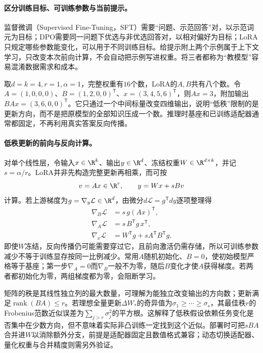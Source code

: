 \paragraph{区分训练目标、可训练参数与当前提示。}
监督微调（Supervised Fine-Tuning，SFT）需要“问题、示范回答”对，以示范词元为目标；DPO需要同一问题下优选与非优选回答对，以相对偏好为目标；LoRA只规定哪些参数能变化，可以用于不同训练目标。给提示附上两个示例属于上下文学习，只改变本次前向计算，不会自动把示例写进权重。将三者都称为“教模型”容易混淆数据需求和成本。

取$d=k=4,r=1,\alpha=1$，完整权重有$16$个数，LoRA的$A,B$共有八个数。令$A=(1,0,0,0)$、$B=(1,2,0,0)^{\mathsf T}$、$x=(3,4,5,6)^{\mathsf T}$，则$Ax=3$，附加输出$BAx=(3,6,0,0)^{\mathsf T}$。它只通过一个中间标量改变四维输出，说明“低秩”限制的是更新方向，而不是把原模型的全部知识压成一个数。推理时基座和已训练适配器通常都固定，不再利用真实答案反向传播。

\paragraph{低秩更新的前向与反向计算。}
对单个线性层，令输入$x\in\R^k$、输出$y\in\R^d$、冻结权重$W\in\R^{d\times k}$，并记$s=\alpha/r$。LoRA并非先构造完整更新再相乘，而可按
\begin{equation}
 v=Ax\in\R^r,\qquad y=Wx+sBv
\end{equation}
计算。若上游梯度为$g=\nabla_y\mathcal L\in\R^d$，由微分$d\mathcal L=g^{\mathsf T}dy$逐项整理得
\begin{align}
 \nabla_B\mathcal L&=s\,g(Ax)^{\mathsf T},\\
 \nabla_A\mathcal L&=s\,B^{\mathsf T}g\,x^{\mathsf T},\\
 \nabla_x\mathcal L&=W^{\mathsf T}g+sA^{\mathsf T}B^{\mathsf T}g.
\end{align}
即使$W$冻结，反向传播仍可能需要穿过它，且前向激活仍需存储，所以可训练参数减少不等于训练显存按同一比例减少。常用$A$随机初始化、$B=0$，使初始模型严格等于基座；第一步$\nabla_A=0$而$\nabla_B$一般不为零，随后$B$变化才使$A$获得梯度。若两者都初始化为零，两组梯度都为零，会阻断学习。

矩阵的秩是其线性独立列的最大数量，可理解为能独立改变输出的方向数；更新满足$\operatorname{rank}(BA)\leq r$。若理想全量更新$\Delta W_*$的奇异值为$\sigma_1\geq\cdots\geq\sigma_s$，其最佳秩$r$的Frobenius范数近似误差为$\sum_{j>r}\sigma_j^2$的平方根。这解释了低秩假设依赖任务变化是否集中在少数方向，但不意味着实际非凸训练一定找到这个近似。部署时可把$sBA$合并进$W$以消除额外分支，前提是适配器固定且数值格式兼容；动态切换适配器、量化权重与合并精度则需另外验证。

